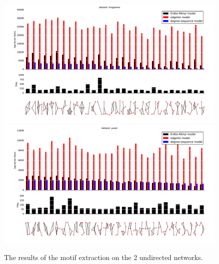 \begin{figure}[h]
  \includegraphics[width=\textwidth]{./images/kingjames/compare-plot.pdf}\\
  \includegraphics[width=\textwidth]{./images/yeast/compare-plot.pdf}\\
  \caption{The results of the motif extraction on the 2 undirected networks.}
  \label{figure:plot-und}
\end{figure}
  
